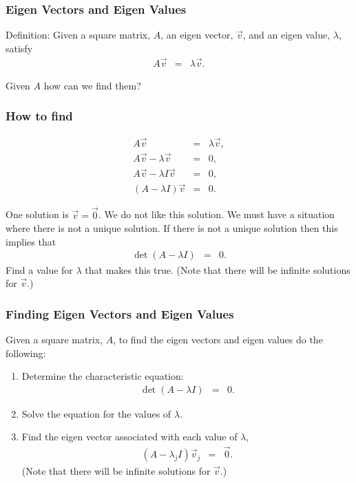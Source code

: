\documentclass{beamer}
\newcommand{\lp}{\left(}
\newcommand{\rp}{\right)}
\begin{document}
\begin{frame}
  \frametitle{Eigen Vectors and Eigen Values}

  Definition: Given a square matrix, $A$, an eigen vector, $\vec{v}$, and an
  eigen value, $\lambda$, satisfy
  \begin{eqnarray*}
    A \vec{v} & = & \lambda \vec{v}.
  \end{eqnarray*}

  Given $A$ how can we find them?

\end{frame}


\begin{frame}
  \frametitle{How to find}

  \begin{eqnarray*}
    A \vec{v} & = & \lambda \vec{v}, \\
    A \vec{v} - \lambda \vec{v} & = & 0, \\
    A \vec{v} - \lambda I \vec{v} & = & 0, \\
    \lp A - \lambda I \rp \vec{v} & = & 0.
  \end{eqnarray*}

  One solution is $\vec{v}=\vec{0}$. We do not like this solution. We
  must have a situation where there is not a unique solution. If there
  is not a unique solution then this implies that
  \begin{eqnarray*}
    \det\lp A - \lambda I \rp & = & 0.
  \end{eqnarray*}
  Find a value for $\lambda$ that makes this true. (Note that there
  will be infinite solutions for $\vec{v}$.)

\end{frame}


\begin{frame}
  \frametitle{Finding Eigen Vectors and Eigen Values}

  Given a square matrix, $A$, to find the eigen vectors and eigen
  values do the following:
  \begin{enumerate}
  \item Determine the characteristic equation:
    \begin{eqnarray*}
      \det\lp A - \lambda I \rp & = & 0.
    \end{eqnarray*}
  \item Solve the equation for the values of $\lambda$.
  \item Find the eigen vector associated with each value of $\lambda$,
    \begin{eqnarray*}
      \lp A - \lambda_j I \rp \vec{v}_j & = & \vec{0}.
    \end{eqnarray*}
    (Note that there will be infinite solutions for $\vec{v}$.)
  \end{enumerate}

\end{frame}
\end{document}
